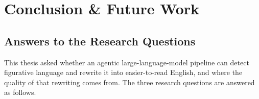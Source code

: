 \section{Conclusion \& Future Work}
\label{ch:conclusion}


\subsection{Answers to the Research Questions}

This thesis asked whether an agentic large-language-model pipeline can detect
figurative language and rewrite it into easier-to-read English, and where the
quality of that rewriting comes from. The three research questions are answered
as follows.


